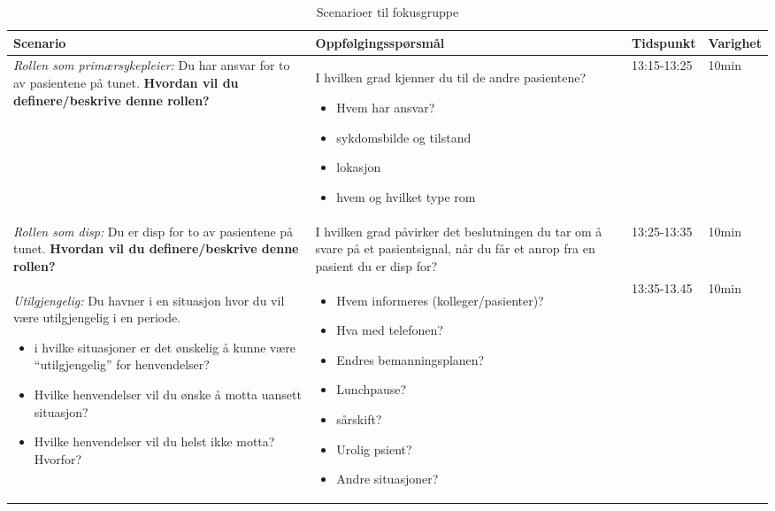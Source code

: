 \begin{table}[H]
\small
\caption{Scenarioer til fokusgruppe}
\begin{tabular}{p{4cm}|p{5cm}|l|l}
\hline
\textbf{Scenario} & \textbf{Oppfølgingsspørsmål} & \textbf{Tidspunkt} & \textbf{Varighet}\\
\hline
\emph{Rollen som primærsykepleier:} Du har ansvar for to av pasientene på tunet. \textbf{Hvordan vil du definere/beskrive denne rollen?} & I hvilken grad kjenner du til de andre pasientene? \begin{itemize}
\item Hvem har ansvar?
\item sykdomsbilde og tilstand
\item lokasjon
\item hvem og hvilket type rom
\end{itemize}
& 13:15-13:25 & 10min\\
\hline
\emph{Rollen som disp:} Du er disp for to av pasientene på tunet. \textbf{Hvordan vil du definere/beskrive denne rollen?} & I hvilken grad påvirker det beslutningen du tar om å svare på et pasientsignal, når du får et anrop fra en pasient du er disp for?
 & 13:25-13:35 & 10min\\
\hline
\emph{Utilgjengelig:} Du havner i en situasjon hvor du vil være utilgjengelig i en periode.
\begin{itemize}
\item i hvilke situasjoner er det ønskelig å kunne være “utilgjengelig” for henvendelser?
\item Hvilke henvendelser vil du ønske å motta uansett situasjon?
\item Hvilke henvendelser vil du helst ikke motta? Hvorfor?
\end{itemize}
& 
\begin{itemize}
\item Hvem informeres (kolleger/pasienter)?
\item Hva med telefonen?
\item Endres bemanningsplanen?
\item Lunchpause?
\item sårskift?
\item Urolig psient?
\item Andre situasjoner?
\end{itemize}
& 13:35-13.45 & 10min\\
\end{tabular}
\label{Steg2}
\end{table}

